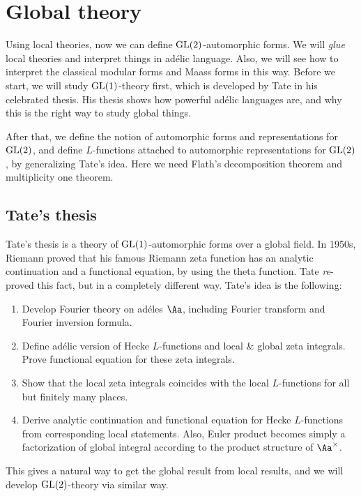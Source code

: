 \newpage

\section{Global theory}

Using local theories, now we can define $\mathrm{GL}(2)$-automorphic forms. We will \emph{glue} local theories and interpret things in ad\'elic language. Also, we will see how to interpret the classical modular forms and Maass forms in this way. Before we start, we will study $\mathrm{GL}(1)$-theory first, which is developed by Tate in his celebrated thesis. His thesis shows how powerful ad\'elic languages are, and why this is the right way to study global things. 

After that, we define the notion of automorphic forms and representations for $\mathrm{GL}(2)$, and define $L$-functions attached to automorphic representations for $\mathrm{GL}(2)$, by generalizing Tate's idea. 
Here we need Flath's decomposition theorem and multiplicity one theorem. 

\subsection{Tate's thesis}

Tate's thesis is a theory of $\mathrm{GL}(1)$-automorphic forms over a global field. In 1950s, Riemann proved that his famous Riemann zeta function has an analytic continuation and a functional equation, by using the theta function. Tate \emph{re}-proved this fact, but in a completely different way.
Tate's idea is the following:
\begin{enumerate}
\item Develop Fourier theory on ad\'eles $\Aa$, including Fourier transform and Fourier inversion formula.
\item Define ad\'elic version of Hecke $L$-functions and local \& global zeta integrals. Prove functional equation for these zeta integrals. 
\item Show that the local zeta integrals coincides with the local $L$-functions for all but finitely many places. 
\item Derive analytic continuation and functional equation for Hecke $L$-functions  from corresponding local statements. Also, Euler product becomes simply a factorization of global integral according to the product structure of $\Aa^{\times}$. 
\end{enumerate}
This gives a natural way to get the global result from local results, and we will develop $\mathrm{GL}(2)$-theory via similar way. 


